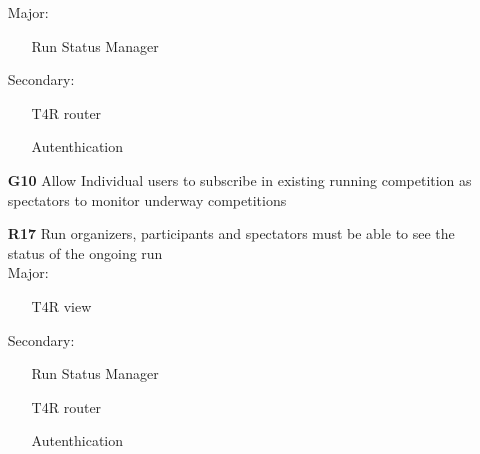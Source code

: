 \begin{itemize}
Major:
\begin{itemize}
\item[\textbullet]Run Status Manager
\end{itemize}
Secondary:
\begin{itemize}
\item[\textbullet]T4R router
\item[\textbullet]Autenthication
\end{itemize}

\item [\textbf{G10}] Allow Individual users to subscribe in existing running competition as spectators to monitor underway competitions

\subitem \textbf{R17} Run organizers, participants and spectators must be able to see the status of the ongoing run\\

Major:
\begin{itemize}
\item[\textbullet]T4R view
\end{itemize}
Secondary:
\begin{itemize}
\item[\textbullet]Run Status Manager
\item[\textbullet]T4R router
\item[\textbullet]Autenthication
\end{itemize}
\end{itemize}
